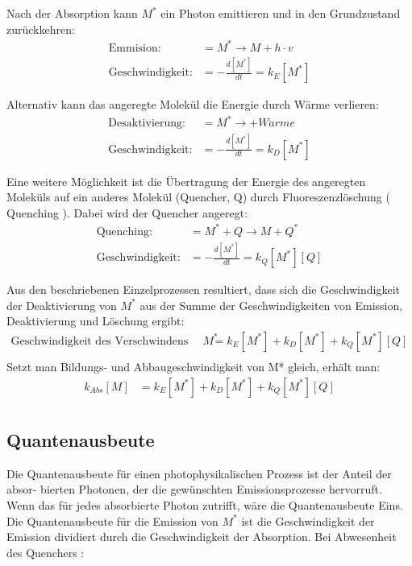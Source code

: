 \documentclass[12pt]{article}
\begin{document}
Nach der Absorption kann $M^*$ ein Photon emittieren und in den Grundzustand zurückkehren:
\begin{align*}
  \text{Emmision:} &= M^* \rightarrow M +  h \cdot v\\
  \text{Geschwindigkeit:} &= -\frac{d[M^*]}{dt} = k _{E} [M^*]
\end{align*}

Alternativ kann das angeregte Molekül die Energie durch Wärme verlieren:
\begin{align*}
  \text{Desaktivierung:} &= M^* \rightarrow +  W\ddot{a}rme\\
  \text{Geschwindigkeit:} &= - \frac{d[M^*]}{dt} = k _{D} [M^*]
\end{align*}

Eine weitere Möglichkeit ist die Übertragung der Energie des angeregten Moleküls auf ein
anderes Molekül (Quencher, Q) durch Fluoreszenzlöschung ( Quenching ). Dabei wird
der Quencher angeregt:
\begin{align*}
  \text{Quenching:} &= M^* + Q \rightarrow M +  Q^*\\
  \text{Geschwindigkeit:} &= - \frac{d[M^*]}{dt} = k _{Q} [M^*] [Q]
\end{align*}

Aus den beschriebenen Einzelprozessen resultiert, dass sich die Geschwindigkeit der Deaktivierung von $M^*$ aus der Summe der Geschwindigkeiten von Emission, Deaktivierung
und Löschung ergibt:
\begin{align*}
  \text{Geschwindigkeit des Verschwindens von } M^* &=  k _{E} [M^*] + k _{D} [M^*] + k _{Q} [M^*] [Q]\\
\end{align*}
Setzt man Bildungs- und Abbaugeschwindigkeit von M* gleich, erhält man:
\begin{align*}
  k_{Abs} [M] &=  k _{E} [M^*] + k _{D} [M^*] + k _{Q} [M^*] [Q]\\
\end{align*}
\subsection{Quantenausbeute\supercite{harris}} %
\label{ssub:quantenausbeute}

\grqq Die Quantenausbeute für einen photophysikalischen Prozess ist der Anteil der absor-
bierten Photonen, der die gewünschten Emissionsprozesse hervorruft. Wenn das für jedes
absorbierte Photon zutrifft, wäre die Quantenausbeute Eins.\grqq
Die Quantenausbeute für die Emission von $M^*$ ist die Geschwindigkeit der Emission
dividiert durch die Geschwindigkeit der Absorption. Bei Abwesenheit des Quenchers :
\end{document}
